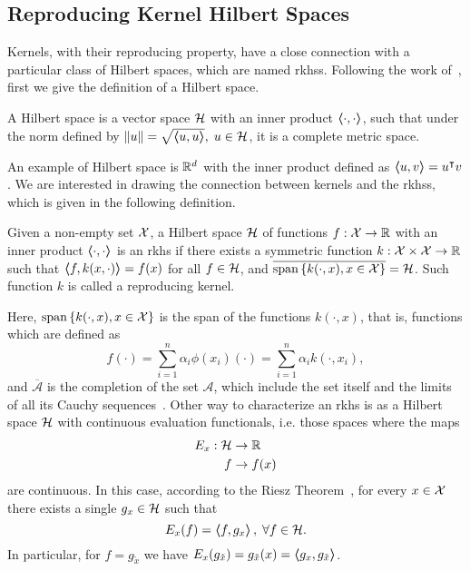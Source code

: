 \subsection{Reproducing Kernel Hilbert Spaces}
%
Kernels, with their reproducing property, have a close connection with a particular class of Hilbert spaces, which are named \acrfull{rkhss}. Following the work of~\citet{ScholkopfS02}, first we give the definition of a Hilbert space.
%
\begin{definition}
    A Hilbert space is a vector space $\mathcal{H}$ with an inner product $\bm{\left\langle} \cdot, \cdot \bm{\right\rangle}$, such that under the norm defined by $\left\lVert u\right\rVert = \sqrt{\bm{\left\langle} u, u \bm{\right\rangle}}, \; u \in \mathcal{H}$, it is a complete metric space.
\end{definition}
%
An example of Hilbert space is $\mathbb{R}^d$ with the inner product defined as $\bm{\left\langle} u, v \bm{\right\rangle} = u^\intercal v$.
%
We are interested in drawing the connection between kernels and the \acrshort{rkhss}, which is given in the following definition.
\begin{definition}
    Given a non-empty set $\mathcal{X}$, a Hilbert space $\mathcal{H}$ of functions $f: \mathcal{X} \to \mathbb{R}$ with an inner product $\bm{\left\langle} \cdot, \cdot \bm{\right\rangle}$ is an \acrshort{rkhs} if there exists a symmetric function $k: \mathcal{X} \times \mathcal{X} \to \mathbb{R}$ such that $\bm{\left\langle} f, k(x, \cdot) \bm{\right\rangle} = f(x)$ for all $f \in \mathcal{H}$, and $\overline{\operatorname{span}{\left\{k(\cdot, x), x \in \mathcal{X}\right\}}} = \mathcal{H}$. Such function $k$ is called a reproducing kernel.
\end{definition}
Here, $\operatorname{span}{\left\{k(\cdot, x), x \in \mathcal{X}\right\}}$ is the span of the functions $k(\cdot, x)$, that is, functions which are defined as
$$ f(\cdot) = \sum_{i=1}^n \alpha_i \phi(x_i)(\cdot) =\sum_{i=1}^n \alpha_i k(\cdot, x_i), $$
and $\overline{\mathcal{A}}$ is the completion of the set $\mathcal{A}$, which include the set itself and the limits of all its Cauchy sequences~\citep{kelley2017general}.
Other way to characterize an \acrshort{rkhs} is as a Hilbert space $\mathcal{H}$ with continuous evaluation functionals, i.e. those spaces where the maps
\begin{equation}
            \begin{aligned}
        \nonumber
        E_{x}: \mathcal{H} &\to \mathbb{R} \\
        f &\to f(x) 
    \end{aligned}
\end{equation}
are continuous.
In this case, according to the Riesz Theorem~\citep{Whittaker1991ACI}, for every $x \in \mathcal{X}$ there exists a single $g_x \in \mathcal{H}$ such that
$$ E_x(f) = \bm{\left\langle} f, g_x \bm{\right\rangle}, \; \forall f \in \mathcal{H}.$$
In particular, for $f = g_{\tilde{x}}$ we have $E_x(g_{\tilde{x}}) = g_{{\tilde{x}}}(x) = \bm{\left\langle} g_x, g_{\tilde{x}} \bm{\right\rangle}$. 

